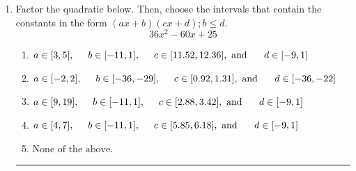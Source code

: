 \documentclass[14pt]{extbook}
\newcommand{\litem}[1]{\item#1\hspace*{-1cm}\rule{\textwidth}{0.4pt}}
\begin{document}
\begin{enumerate}
{\begin{enumerate}[label=\Alph*.]
\end{enumerate} }
\litem{
Factor the quadratic below. Then, choose the intervals that contain the constants in the form $(ax+b)(cx+d); b \leq d.$\[ 36x^{2} -60 x + 25 \]\begin{enumerate}[label=\Alph*.]
\item \( a \in [3, 5], \hspace*{5mm} b \in [-11, 1], \hspace*{5mm} c \in [11.52, 12.36], \text{ and } \hspace*{5mm} d \in [-9, 1] \)
\item \( a \in [-2, 2], \hspace*{5mm} b \in [-36, -29], \hspace*{5mm} c \in [0.92, 1.31], \text{ and } \hspace*{5mm} d \in [-36, -22] \)
\item \( a \in [9, 19], \hspace*{5mm} b \in [-11, 1], \hspace*{5mm} c \in [2.88, 3.42], \text{ and } \hspace*{5mm} d \in [-9, 1] \)
\item \( a \in [4, 7], \hspace*{5mm} b \in [-11, 1], \hspace*{5mm} c \in [5.85, 6.18], \text{ and } \hspace*{5mm} d \in [-9, 1] \)
\item \( \text{None of the above.} \)


\end{enumerate}}
\end{enumerate}
\end{document}
